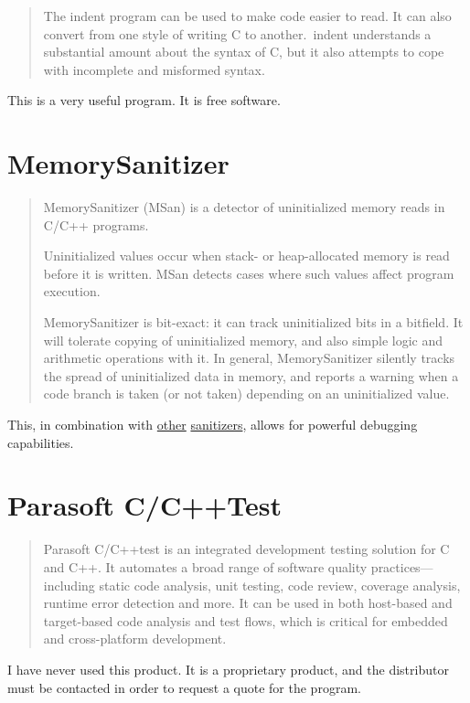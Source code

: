 \documentclass[12pt]{article}
\begin{document}
\begin{quote}
The indent program can be used to make code easier to read. It
can also convert from one style of writing C to another.\ indent
understands a substantial amount about the syntax of C, but it also
attempts to cope with incomplete and misformed syntax.
\end{quote}

This is a very useful program. It is free software.

\cite{indent}
\section{MemorySanitizer}

\begin{quote}
MemorySanitizer (MSan) is a detector of uninitialized memory reads
in C/C++ programs.

Uninitialized values occur when stack- or heap-allocated memory
is read before it is written. MSan detects cases where such values
affect program execution.

MemorySanitizer is bit-exact: it can track uninitialized bits in
a bitfield. It will tolerate copying of uninitialized memory, and
also simple logic and arithmetic operations with it. In general,
MemorySanitizer silently tracks the spread of uninitialized data in
memory, and reports a warning when a code branch is taken (or not
taken) depending on an uninitialized value.
\end{quote}

\label{msan}
This, in combination with \hyperref[asan]{other} \hyperref[tsan]{sanitizers},
allows for powerful debugging capabilities.

\cite{msan}
\section{Parasoft C/C++Test}

\begin{quote}
Parasoft C/C++test is an integrated development testing solution for C and
C++. It automates a broad range of software quality practices—including
static code analysis, unit testing, code review, coverage analysis,
runtime error detection and more. It can be used in both host-based
and target-based code analysis and test flows, which is critical for
embedded and cross-platform development.
\end{quote}

I have never used this product. It is a proprietary product, and the
distributor must be contacted in order to request a quote for the program.
\end{document}
